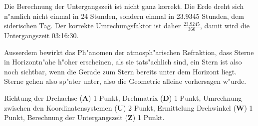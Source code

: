 \begin{diskussion}
Die Berechnung der Untergangszeit ist nicht ganz korrekt. Die Erde dreht
sich n"amlich nicht einmal in 24 Stunden, sondern einmal in 23.9345 Stunden,
dem siderischen Tag.
Der korrekte Umrechungsfaktor ist daher $\frac{23.9245}{360}$, damit
wird die Untergangszeit 03:16:30.

Ausserdem bewirkt das Ph"anomen der atmosph"arischen Refraktion, dass
Sterne in Horizontn"ahe h"oher erscheinen, als sie tats"achlich
sind, ein Stern ist also noch sichtbar, wenn die Gerade zum Stern bereits
unter dem Horizont liegt.
Sterne gehen also sp"ater unter, also die Geometrie alleine vorhersagen
w"urde.
\end{diskussion}

\begin{bewertung}
Richtung der Drehachse (\textbf{A}) 1 Punkt,
Drehmatrix (\textbf{D}) 1 Punkt,
Umrechnung zwischen den Koordinatensystemen (\textbf{U}) 2 Punkt,
Ermittelung Drehwinkel (\textbf{W}) 1 Punkt,
Berechnung der Untergangszeit (\textbf{Z}) 1 Punkt.
\end{bewertung}
